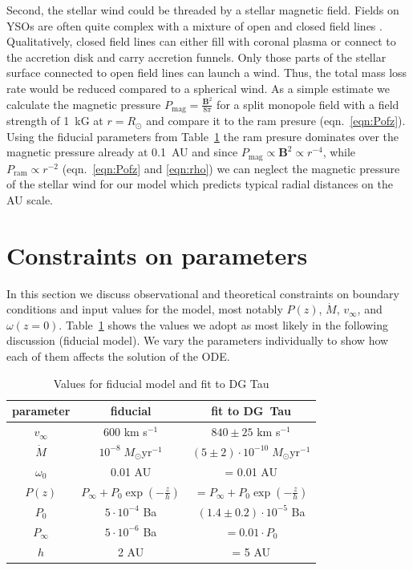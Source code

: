 \documentclass[manuscript]{aastex}
\begin{document}
Second, the stellar wind could be threaded by a stellar magnetic field. Fields on YSOs are often quite complex with a mixture of open and closed field lines \citep[e.g.][]{2011MNRAS.417..472D,2012MNRAS.425.2948D}.
Qualitatively, closed field lines can either fill with coronal plasma or connect to the accretion disk and carry accretion funnels. Only those parts of the stellar surface connected to open field lines can launch a wind. Thus, the total mass loss rate would be reduced compared to a spherical wind. 
As a simple estimate we calculate the magnetic pressure $P_{\textrm{mag}}=\frac{\boldsymbol{B}^2}{8 \pi}$ for a split monopole field with a field strength of 1~kG at $r=R_\odot$ and compare it to the ram presure (eqn.~\ref{eqn:Pofz}). Using the fiducial parameters from Table~\ref{tab:fiducial} the ram presure dominates over the magnetic pressure already at 0.1~AU and since $P_{\textrm{mag}} \propto \boldsymbol{B}^2 \propto r^{-4}$, while $P_{\textrm{ram}} \propto r^{-2}$ (eqn.~\ref{eqn:Pofz} and \ref{eqn:rho}) we can neglect the magnetic pressure of the stellar wind for our model which predicts typical radial distances on the AU scale.

\section{Constraints on parameters}
\label{sect:parameters}
In this section we discuss observational and theoretical constraints on boundary conditions and input values for the model, most notably $P(z)$, $\dot M$, $v_\infty$, and $\omega(z=0)$. Table~\ref{tab:fiducial} shows the values we adopt as most likely in the following discussion (fiducial model). We vary the parameters individually to show how each of them affects the solution of the ODE. 
\begin{table}
\caption{\label{tab:fiducial}Values for fiducial model and fit to DG Tau}
\begin{tabular}{ccc}
\hline\hline
parameter & fiducial & fit to DG~Tau\tablenotemark{a}\\
\hline
$v_\infty$ & 600 km s$^{-1}$ & $840\pm25$ km s$^{-1}$\\
$\dot M$ & $10^{-8}\;M_\odot\textrm{yr}^{-1}$ & $(5\pm2)\cdot10^{-10}\;M_\odot\textrm{yr}^{-1}$\\
$\omega_0$ & 0.01 AU & = 0.01 AU\tablenotemark{b}\\
$P(z)$ & $P_\infty+P_0\exp\left(-\frac{z}{h}\right)$ & $=P_\infty+P_0\exp\left(-\frac{z}{h}\right)$\\
$P_0$ & $5\cdot 10^{-4}$ Ba &  $(1.4\pm0.2)\cdot 10^{-5}$ Ba\\
$P_\infty$ & $5\cdot 10^{-6}$ Ba & $=0.01\cdot P_0$\\
$h$ & 2 AU & = 5 AU\tablenotemark{b}\\
\hline
\end{tabular}
\end{table}
\end{document}
